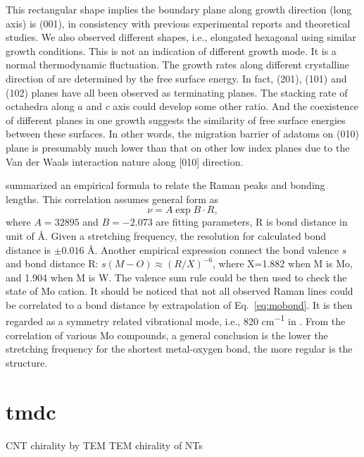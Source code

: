 This rectangular shape implies the boundary plane along growth direction (long axis) is (001), in consistency with previous experimental reports\cite{Zeng1998,Li2002b} and theoretical studies.\cite{Firment1983,Cora1997} We also observed different shapes, i.e., elongated hexagonal using similar growth conditions. This is not an indication of different growth mode. It is a normal thermodynamic fluctuation. The growth rates along different crystalline direction of  are determined by the free surface energy. In fact, (201), (101) and (102) planes have all been observed as terminating planes.\cite{Zeng1998} The stacking rate of  octahedra along $a$ and $c$ axis could develop some other ratio. And the coexistence of different planes in one growth suggests the similarity of free surface energies between these surfaces. In other words, the migration barrier of adatoms on (010) plane is presumably much lower than that on other low index planes due to the Van der Waals interaction nature along [010] direction.


\citeauthor{Hardcastle1990} summarized an empirical formula to relate the Raman peaks and  bonding lengths.\cite{Hardcastle1990} This correlation assumes general form as
\begin{equation}\label{eq:mobond}
\nu = A \exp{B\cdot R},
\end{equation}
where $A=32895$ and $B=-2.073$ are fitting parameters, R is bond distance in unit of \AA. Given a stretching frequency, the resolution for calculated bond distance is $\pm0.016$ \AA. Another empirical expression connect the bond valence $s$ and bond distance R: $s(M-O) \approx (R/X)^{-6} $, where X=1.882 when M is Mo, and 1.904 when M is W. The valence sum rule could be then used to check the state of Mo cation. It should be noticed that not all observed Raman lines could be correlated to a  bond distance by extrapolation of Eq.~\ref{eq:mobond}. It is then regarded as a symmetry related vibrational mode, i.e., 820 \si{cm^{-1}} in . From the correlation of various Mo compounds, a general conclusion is the lower the stretching frequency for the shortest metal-oxygen bond, the more regular is the structure.


\chapter{tmdc}


CNT chirality by TEM \cite{Zhang1993} TEM chirality of  NTs


